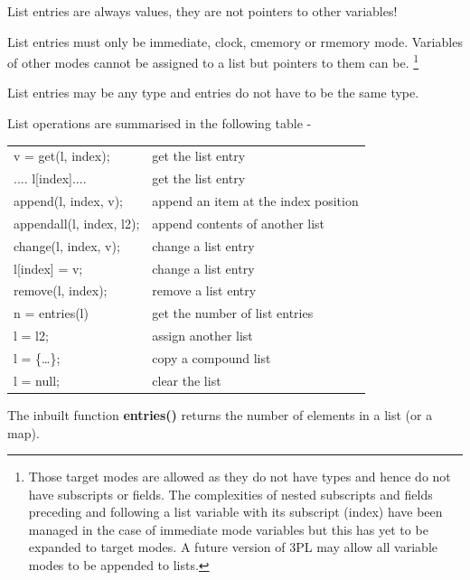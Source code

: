             List entries are always values, they are not pointers to other
            variables!     
            
            List entries must only be immediate, clock, cmemory or rmemory mode.
            Variables of other modes cannot be assigned to a list but pointers to
            them can be. \footnote {Those target modes are allowed as they do
            not have types and hence do not have subscripts or fields. The
            complexities of nested subscripts and fields preceding and following
            a list variable with its subscript (index) have been managed in the
            case of immediate mode variables but this has yet to be expanded
            to target modes. A future version of 3PL may allow all variable
            modes to be appended to lists.}
            
            List entries may be any type and entries do not have to be
            the same type.
            
            List operations are summarised in the following table -
            
            \begin{tabular}{| l | l |}
            \hline
            v = get(l, index);          & get the list entry \\
            .... l[index]....           & get the list entry \\
            append(l, index, v);        & append an item at the index position \\
            appendall(l, index, l2);    & append contents of another list \\
            change(l, index, v);        & change a list entry \\
            l[index] = v;               & change a list entry \\
            remove(l, index);           & remove a list entry \\
            n = entries(l)              & get the number of list entries \\
            \hline
            l = l2;                     & assign another list \\
            l = \{\dots\};              & copy a compound list \\
            l = null;                   & clear the list \\
            \hline
            \end{tabular}

            The inbuilt function {\bf entries()} returns the number of elements in
            a list (or a map).
            
